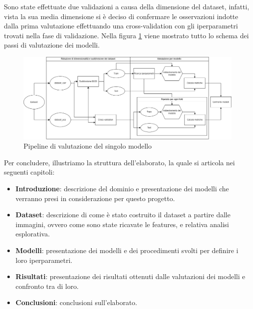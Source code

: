 Sono state effettuate due validazioni a causa della dimensione del dataset,
infatti, vista la sua media dimensione si è deciso di confermare le osservazioni
indotte dalla prima valutazione effettuando una cross-validation con gli
iperparametri trovati nella fase di validazione. Nella figura \ref{fig:pipeline}
viene mostrato tutto lo schema dei passi di valutazione dei modelli.
\begin{figure}[!ht]
      \centering
      \includegraphics[width=\textwidth]{img/introduzione/schema_pipeline_valutazione_modelli.png}
      \caption{Pipeline di valutazione del singolo modello}
      \label{fig:pipeline}
\end{figure}

Per concludere, illustriamo la struttura dell'elaborato, la quale si articola
nei seguenti capitoli:
\begin{itemize}
      \item \textbf{Introduzione}: descrizione del dominio e presentazione dei
            modelli che verranno presi in considerazione per questo progetto.
      \item \textbf{Dataset}: descrizione di come è stato costruito il dataset a
            partire dalle immagini, ovvero come sono state ricavate le features,
            e relativa analisi esplorativa.
      \item \textbf{Modelli}: presentazione dei modelli e dei procedimenti svolti
            per definire i loro iperparametri.
      \item \textbf{Risultati}: presentazione dei risultati ottenuti dalle valutazioni
            dei modelli e confronto tra di loro.
      \item \textbf{Conclusioni}: conclusioni sull'elaborato.
\end{itemize}